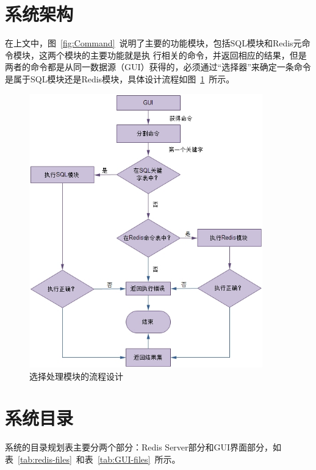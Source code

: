 \documentclass{zjutthesis}
\begin{document}
\section{系统架构}
在上文中，图~\ref{fig:Command}~说明了主要的功能模块，包括SQL模块和Redis元命令模块，这两个模块的主要功能就是执
行相关的命令，并返回相应的结果，但是两者的命令都是从同一数据源（GUI）获得的，必须通过“选择器”来确定一条命令是属于SQL模块还是Redis模块，具体设计流程如图~\ref{fig:Selector}~所示。
\begin{figure}[H]
\centering
\includegraphics[width=0.9\textwidth]{Selector}
\caption{选择处理模块的流程设计}\label{fig:Selector}
\vspace{\baselineskip} %
\end{figure}

\section{系统目录}
系统的目录规划表主要分两个部分：Redis Server部分和GUI界面部分，如表~\ref{tab:redis-files}~和表~\ref{tab:GUI-files}~所示。

\begin{table}[H]
\centering
\caption{系统目录规划表（Redis Server部分）}\label{tab:redis-files}
\vspace{\baselineskip}
\end{table}
\end{document}
